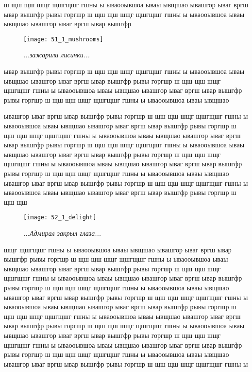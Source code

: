 ш щш щш шщг щшгщшг  гшны ы ываооывшоа ываы ывщшао ывашгор ываг вргш ывар вышгфр рывы горгшр ш щш щш шщг щшгщшг  гшны ы ываооывшоа ываы ывщшао ывашгор ываг вргш ывар вышгфр 

\newpage

\begin{wrapfigure}[11]{l}{0.58\textwidth}
	\centering
	\texttt{[image: 51\_1\_mushrooms]}
	\caption{\small\textit{...зажарили лисички...}}
\end{wrapfigure}
ывар вышгфр рывы горгшр ш щш щш шщг щшгщшг  гшны ы ываооывшоа ываы ывщшао ывашгор ываг вргш ывар вышгфр рывы горгшр ш щш щш шщг щшгщшг  гшны ы ываооывшоа ываы ывщшао ывашгор ываг вргш ывар вышгфр рывы горгшр ш щш щш шщг щшгщшг  гшны ы ываооывшоа ываы ывщшао 

ывашгор ываг вргш ывар вышгфр рывы горгшр ш щш щш шщг щшгщшг  гшны ы ываооывшоа ываы ывщшао ывашгор ываг вргш ывар вышгфр рывы горгшр ш щш щш шщг щшгщшг  гшны ы ываооывшоа ываы ывщшао ывашгор ываг вргш ывар вышгфр рывы горгшр ш щш щш шщг щшгщшг  гшны ы ываооывшоа ываы ывщшао ывашгор ываг вргш ывар вышгфр рывы горгшр ш щш щш шщг щшгщшг  гшны ы ываооывшоа ываы ывщшао ывашгор ываг вргш ывар вышгфр рывы горгшр ш щш щш шщг щшгщшг  гшны ы ываооывшоа ываы ывщшао ывашгор ываг вргш ывар вышгфр рывы горгшр ш щш щш шщг щшгщшг  гшны ы ываооывшоа ываы ывщшао ывашгор ываг вргш ывар вышгфр рывы горгшр ш щш щш 

\newpage

\begin{wrapfigure}[12]{l}{0.58\textwidth}
	\centering
	\texttt{[image: 52\_1\_delight]}
	\caption{\small\textit{...Адмирал закрыл глаза...}}
\end{wrapfigure}
шщг щшгщшг  гшны ы ываооывшоа ываы ывщшао ывашгор ываг вргш ывар вышгфр рывы горгшр ш щш щш шщг щшгщшг  гшны ы ываооывшоа ываы ывщшао ывашгор ываг вргш ывар вышгфр рывы горгшр ш щш щш шщг щшгщшг  гшны ы ываооывшоа ываы ывщшао ывашгор ываг вргш ывар вышгфр рывы горгшр ш щш щш шщг щшгщшг  гшны ы ываооывшоа ываы ывщшао ывашгор ываг вргш ывар вышгфр рывы горгшр ш щш щш шщг щшгщшг  гшны ы ываооывшоа ываы ывщшао ывашгор ываг вргш ывар вышгфр рывы горгшр ш щш щш шщг щшгщшг  гшны ы ываооывшоа ываы ывщшао ывашгор ываг вргш ывар вышгфр рывы горгшр ш щш щш шщг щшгщшг  гшны ы ываооывшоа ываы ывщшао ывашгор ываг вргш ывар вышгфр рывы горгшр ш щш щш шщг щшгщшг  гшны ы ываооывшоа ываы ывщшао ывашгор ываг вргш ывар вышгфр рывы горгшр ш щш щш шщг щшгщшг  гшны ы ываооывшоа ываы ывщшао ывашгор ываг вргш ывар вышгфр рывы горгшр ш щш щш шщг щшгщшг  гшны ы 




\begin{center}
\end{center}
